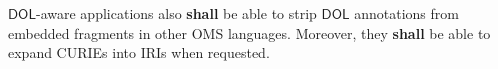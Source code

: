 \documentclass[10pt, a4paper]{isov2}
\makeatletter
\def\cleardoublepage{\clearpage%
        \if@twoside
            \ifodd\c@page\else
                \vspace*{\fill}
                \hfill
                \begin{center}
					
                \end{center}
                \vspace{\fill}
                \thispagestyle{empty}
                \newpage
                \if@twocolumn\hbox{}\newpage\fi
            \fi
        \fi
    }
\newcommand*{\shall}{\textbf{shall}\xspace}
\newcommand*{\DOL}{\ensuremath{\mathsf{DOL}}\xspace}
\makeatother
\begin{document}
\DOL-aware applications also  \shall  be able to strip \DOL annotations
from embedded fragments in other OMS languages. Moreover, they  \shall
be able to expand CURIEs into IRIs when requested.



\newpage
{}
\renewcommand*{\UrlFont}{\footnotesize}
\vspace{-1em}
\end{document}
